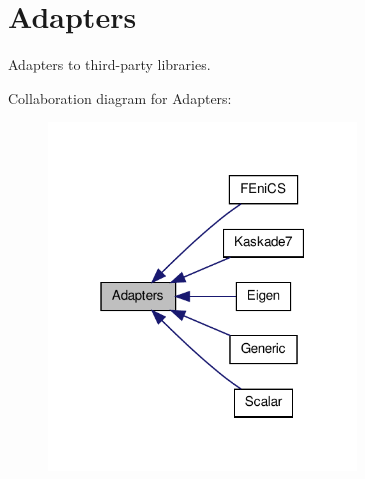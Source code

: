\hypertarget{group__AdapterGroup}{\section{\-Adapters}
\label{group__AdapterGroup}
}


\-Adapters to third-\/party libraries.  


\-Collaboration diagram for \-Adapters\-:
\nopagebreak
\begin{figure}[H]
\begin{center}
\leavevmode
\includegraphics[width=232pt]{group__AdapterGroup}
\end{center}
\end{figure}
